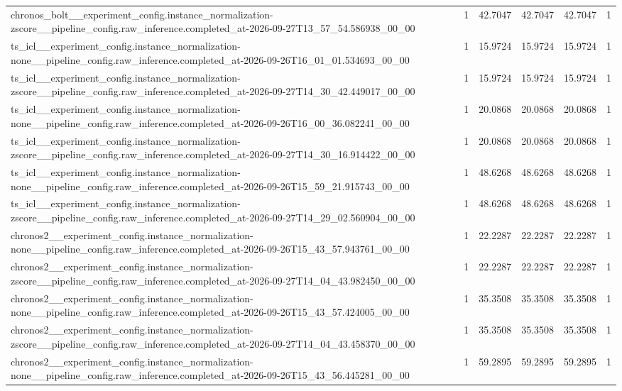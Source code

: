 \begin{tabular}{llllll}
chronos\_bolt\_\_experiment\_config.instance\_normalization-zscore\_\_pipeline\_config.raw\_inference.completed\_at-2026-09-27T13\_57\_54.586938\_00\_00 & 1 & 42.7047 & 42.7047 & 42.7047 & 1 \\
ts\_icl\_\_experiment\_config.instance\_normalization-none\_\_pipeline\_config.raw\_inference.completed\_at-2026-09-26T16\_01\_01.534693\_00\_00 & 1 & 15.9724 & 15.9724 & 15.9724 & 1 \\
ts\_icl\_\_experiment\_config.instance\_normalization-zscore\_\_pipeline\_config.raw\_inference.completed\_at-2026-09-27T14\_30\_42.449017\_00\_00 & 1 & 15.9724 & 15.9724 & 15.9724 & 1 \\
ts\_icl\_\_experiment\_config.instance\_normalization-none\_\_pipeline\_config.raw\_inference.completed\_at-2026-09-26T16\_00\_36.082241\_00\_00 & 1 & 20.0868 & 20.0868 & 20.0868 & 1 \\
ts\_icl\_\_experiment\_config.instance\_normalization-zscore\_\_pipeline\_config.raw\_inference.completed\_at-2026-09-27T14\_30\_16.914422\_00\_00 & 1 & 20.0868 & 20.0868 & 20.0868 & 1 \\
ts\_icl\_\_experiment\_config.instance\_normalization-none\_\_pipeline\_config.raw\_inference.completed\_at-2026-09-26T15\_59\_21.915743\_00\_00 & 1 & 48.6268 & 48.6268 & 48.6268 & 1 \\
ts\_icl\_\_experiment\_config.instance\_normalization-zscore\_\_pipeline\_config.raw\_inference.completed\_at-2026-09-27T14\_29\_02.560904\_00\_00 & 1 & 48.6268 & 48.6268 & 48.6268 & 1 \\
chronos2\_\_experiment\_config.instance\_normalization-none\_\_pipeline\_config.raw\_inference.completed\_at-2026-09-26T15\_43\_57.943761\_00\_00 & 1 & 22.2287 & 22.2287 & 22.2287 & 1 \\
chronos2\_\_experiment\_config.instance\_normalization-zscore\_\_pipeline\_config.raw\_inference.completed\_at-2026-09-27T14\_04\_43.982450\_00\_00 & 1 & 22.2287 & 22.2287 & 22.2287 & 1 \\
chronos2\_\_experiment\_config.instance\_normalization-none\_\_pipeline\_config.raw\_inference.completed\_at-2026-09-26T15\_43\_57.424005\_00\_00 & 1 & 35.3508 & 35.3508 & 35.3508 & 1 \\
chronos2\_\_experiment\_config.instance\_normalization-zscore\_\_pipeline\_config.raw\_inference.completed\_at-2026-09-27T14\_04\_43.458370\_00\_00 & 1 & 35.3508 & 35.3508 & 35.3508 & 1 \\
chronos2\_\_experiment\_config.instance\_normalization-none\_\_pipeline\_config.raw\_inference.completed\_at-2026-09-26T15\_43\_56.445281\_00\_00 & 1 & 59.2895 & 59.2895 & 59.2895 & 1 \\

\end{tabular}
